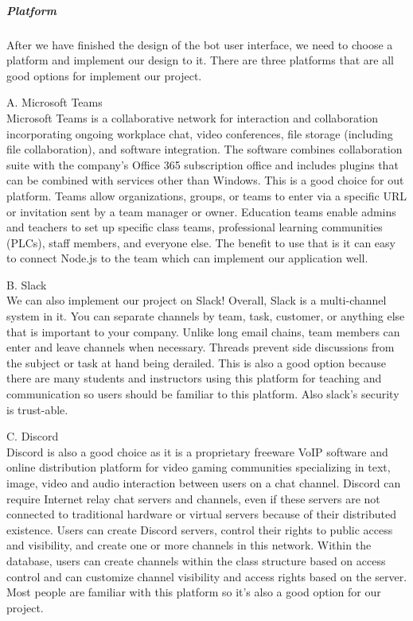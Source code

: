 \subparagraph{Platform}
After we have finished the design of the bot user interface, we need to choose a platform and implement our design to it. There are three platforms that are all good options for implement our project.

A. Microsoft Teams \\
Microsoft Teams is a collaborative network for interaction and collaboration incorporating ongoing workplace chat, video conferences, file storage (including file collaboration), and software integration. The software combines collaboration suite with the company's Office 365 subscription office and includes plugins that can be combined with services other than Windows\cite{teams}. This is a good choice for out platform. Teams allow organizations, groups, or teams to enter via a specific URL or invitation sent by a team manager or owner. Education teams enable admins and teachers to set up specific class teams, professional learning communities (PLCs), staff members, and everyone else\cite{teams}. The benefit to use that is it can easy to connect Node.js to the team which can implement our application well.

B. Slack\\
We can also implement our project on Slack! Overall, Slack is a multi-channel system in it. You can separate channels by team, task, customer, or anything else that is important to your company\cite{slack}. Unlike long email chains, team members can enter and leave channels when necessary\cite{slack}. Threads prevent side discussions from the subject or task at hand being derailed\cite{slack}. This is also a good option because there are many students and instructors using this platform for teaching and communication so users should be familiar to this platform. Also slack's security is trust-able.

C. Discord \\
Discord is also a good choice as it is a proprietary freeware VoIP software and online distribution platform for video gaming communities specializing in text, image, video and audio interaction between users on a chat channel\cite{discord}. Discord can require Internet relay chat servers and channels, even if these servers are not connected to traditional hardware or virtual servers because of their distributed existence\cite{discord}. Users can create Discord servers, control their rights to public access and visibility, and create one or more channels in this network. Within the database, users can create channels within the class structure based on access control and can customize channel visibility and access rights based on the server\cite{discord}. Most people are familiar with this platform so it's also a good option for our project.


